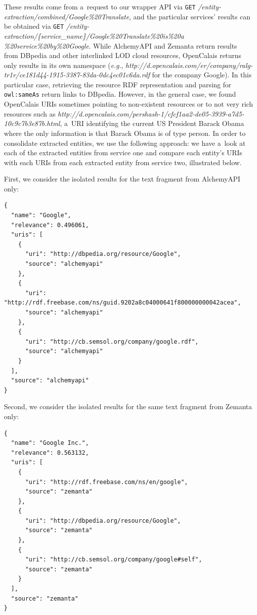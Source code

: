 These results come from a~request to our wrapper API via \texttt{GET} \textit{/entity-extraction/combined/Google\%20Translate},
and the particular services' results can be obtained via \texttt{GET} \textit{/entity-extraction/\{service\_name\}/Google\%20Translate\%20is\%20a\\\%20service\%20by\%20Google}.
While AlchemyAPI and Zemanta return results from DBpedia and other interlinked LOD cloud resources, OpenCalais returns
only results in its own namespace
(\emph{e.g.}, \textit{http://d.opencalais.com/er/company/ralg-tr1r/ce181d44-1915-3387-83da-0dc4ec01c6da.rdf} for the
company Google). In this particular case, retrieving the resource RDF representation and parsing for
\texttt{owl:sameAs} return links to DBpedia. However, in the general case, we found OpenCalais URIs sometimes pointing
to non-existent resources or to not very rich resources such
as \textit{http://d.opencalais.com/pershash-1/cfcf1aa2-de05-3939-a7d5-10c9c7b3e87b.html}, a~URI identifying
the current US President Barack Obama where the only information is that Barack Obama is of type person. In order to
consolidate extracted entities, we use the following approach: we have a~look at each of the extracted entities from
service one and compare each entity's URIs with each URIs from each extracted entity from service two, illustrated below.

First, we consider the isolated results for the text fragment from AlchemyAPI only:

\begin{lstlisting}
{
  "name": "Google",
  "relevance": 0.496061,
  "uris": [
    {
      "uri": "http://dbpedia.org/resource/Google",
      "source": "alchemyapi"
    },
    {
      "uri": "http://rdf.freebase.com/ns/guid.9202a8c04000641f800000000042acea",
      "source": "alchemyapi"
    },
    {
      "uri": "http://cb.semsol.org/company/google.rdf",
      "source": "alchemyapi"
    }
  ],
  "source": "alchemyapi"
}
\end{lstlisting}

Second, we consider the isolated results for the same text fragment from Zemanta only:

\begin{lstlisting}
{
  "name": "Google Inc.",
  "relevance": 0.563132,
  "uris": [
    {
      "uri": "http://rdf.freebase.com/ns/en/google",
      "source": "zemanta"
    },
    {
      "uri": "http://dbpedia.org/resource/Google",
      "source": "zemanta"
    },
    {
      "uri": "http://cb.semsol.org/company/google#self",
      "source": "zemanta"
    }
  ],
  "source": "zemanta"
}
\end{lstlisting}

